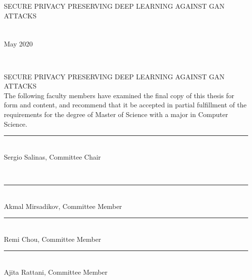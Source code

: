 \documentclass[letterpaper]{article}
\begin{document}
\centering
\large{SECURE PRIVACY PRESERVING DEEP LEARNING AGAINST GAN ATTACKS}\\
[8\baselineskip]
\\
[6\baselineskip]
 \\
[10\baselineskip]
May 2020
\thispagestyle{empty}
\pagebreak

\ 
\vspace{3in}
\begin{center}
\textcopyright{}
\end{center}
\thispagestyle{empty}
\pagebreak

\begin{center}
SECURE PRIVACY PRESERVING DEEP LEARNING AGAINST GAN ATTACKS\\
[3\baselineskip]
The following faculty members have examined the final copy of this thesis for form and content, and recommend that it be accepted in partial fulfillment of the requirements for the degree of Master of Science with a major in Computer Science. \\
[4\baselineskip]
\raggedright{

\rule{3.75in}{0.4pt}\\
Sergio Salinas, Committee Chair} \\
[3\baselineskip]
\rule{3.75in}{0.4pt}\\

Akmal Mirsadikov, Committee Member \\
[3\baselineskip]

\rule{3.75in}{0.4pt}\\
Remi Chou, Committee Member \\
[3\baselineskip]

\rule{3.75in}{0.4pt}\\
Ajita Rattani, Committee Member \\
[3\baselineskip]

\end{center}
\pagebreak
\end{document}
